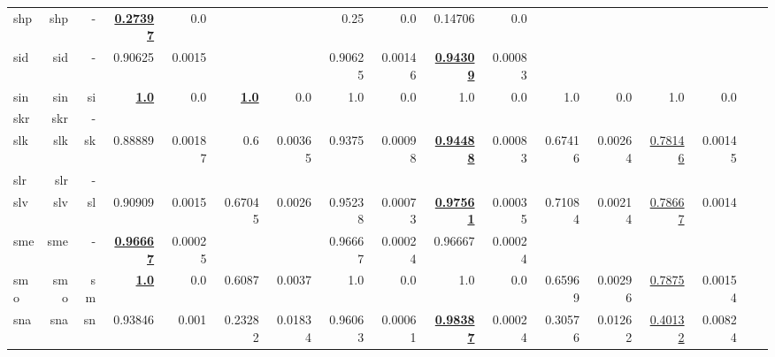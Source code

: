 \documentclass[11pt]{article}
\begin{document}
\begin{table*}[h]
{\begin{tabular}{lrrrrrrrrrrrrrrrr}
shp         & shp         & -         & \textbf{\underline{0.27397}}         & 0.0         &          &          & 0.25         & 0.0         & 0.14706         & 0.0         &          &          &          &          \\
sid         & sid         & -         & 0.90625         & 0.0015         &          &          & 0.90625         & 0.00146         & \textbf{\underline{0.94309}}         & 0.00083         &          &          &          &          \\
sin         & sin         & si         & \textbf{\underline{1.0}}         & 0.0         & \textbf{\underline{1.0}}         & 0.0         & 1.0         & 0.0         & 1.0         & 0.0         & 1.0         & 0.0         & 1.0         & 0.0         \\
skr         & skr         & -         &          &          &          &          &          &          &          &          &          &          &          &          \\
slk         & slk         & sk         & 0.88889         & 0.00187         & 0.6         & 0.00365         & 0.9375         & 0.00098         & \textbf{\underline{0.94488}}         & 0.00083         & 0.67416         & 0.00264         & \underline{0.78146}         & 0.00145         \\
slr         & slr         & -         &          &          &          &          &          &          &          &          &          &          &          &          \\
slv         & slv         & sl         & 0.90909         & 0.0015         & 0.67045         & 0.0026         & 0.95238         & 0.00073         & \textbf{\underline{0.97561}}         & 0.00035         & 0.71084         & 0.00214         & \underline{0.78667}         & 0.0014         \\
sme         & sme         & -         & \textbf{\underline{0.96667}}         & 0.00025         &          &          & 0.96667         & 0.00024         & 0.96667         & 0.00024         &          &          &          &          \\
smo         & smo         & sm         & \textbf{\underline{1.0}}         & 0.0         & 0.6087         & 0.0037         & 1.0         & 0.0         & 1.0         & 0.0         & 0.65969         & 0.00296         & \underline{0.7875}         & 0.00154         \\
sna         & sna         & sn         & 0.93846         & 0.001         & 0.23282         & 0.01834         & 0.96063         & 0.00061         & \textbf{\underline{0.98387}}         & 0.00024         & 0.30576         & 0.01262         & \underline{0.40132}         & 0.00824         \\

\end{tabular}}
\end{table*}
\end{document}
